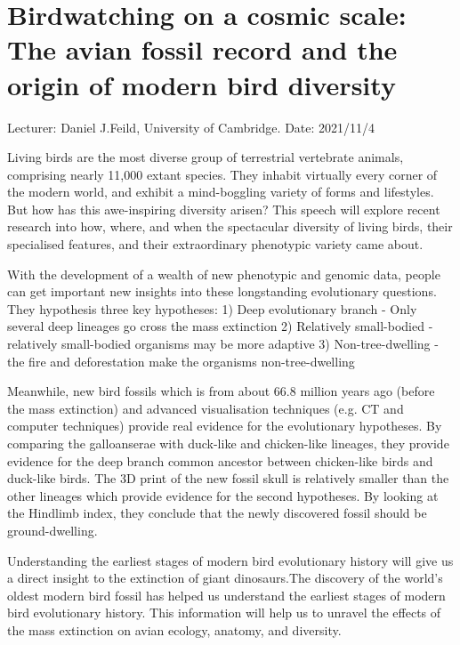 \documentclass[11pt]{article}
\begin{document}
\newpage
    
    
    
\linenumbers
\section{Birdwatching on a cosmic scale: The avian fossil record and the origin of modern bird diversity }
Lecturer: Daniel J.Feild, University of Cambridge.
\newline
Date: 2021/11/4
\newline

Living birds are the most diverse group of terrestrial vertebrate animals, comprising nearly 11,000 extant species. They inhabit virtually every corner of the modern world, and exhibit a mind-boggling variety of forms and lifestyles. But how has this awe-inspiring diversity arisen? This speech will explore recent research into how, where, and when the spectacular diversity of living birds, their specialised features, and their extraordinary phenotypic variety came about.

With the development of a wealth of new phenotypic and genomic data, people can get important new insights into these longstanding evolutionary questions. They hypothesis three key hypotheses: 
1) Deep evolutionary branch
- Only several deep lineages go cross the mass extinction  
2) Relatively small-bodied
- relatively small-bodied organisms may be more adaptive 
3) Non-tree-dwelling
- the fire and deforestation make the organisms non-tree-dwelling

Meanwhile, new bird fossils which is from about 66.8 million years ago (before the mass extinction) and advanced visualisation techniques (e.g.  CT and computer techniques) provide real evidence for the evolutionary hypotheses. By comparing the galloanserae with duck-like and chicken-like lineages, they provide evidence for the deep branch common ancestor between chicken-like birds and duck-like birds. The 3D print of the new fossil skull is relatively smaller than the other lineages which provide evidence for the second hypotheses. By looking at the Hindlimb index, they conclude that the newly discovered fossil should be ground-dwelling.  

Understanding the earliest stages of modern bird evolutionary history will give us a direct insight to the extinction of giant dinosaurs.The discovery of the world's oldest modern bird fossil has helped us understand the earliest stages of modern bird evolutionary history. This information will help us to unravel the effects of the mass extinction on avian ecology, anatomy, and diversity.
\end{document}
